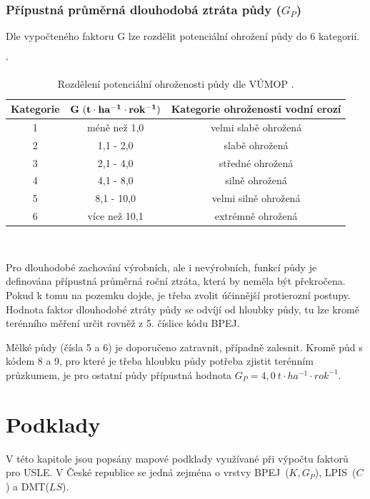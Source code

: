 \subsection{Přípustná průměrná dlouhodobá ztráta půdy ($G_P$)}
Dle vypočteného faktoru G lze rozdělit potenciální ohrožení půdy do 6
kategorií.\cite{vumop}

\begin{table}[!h]
\begin{center}
\catcode`
    \noindent\begin{tabular}{|*{3}{c|}} \hline \bf Kategorie & \bf
    $\bf G~(t\cdot ha^{-1}\cdot rok^{-1})$ & \bf Kategorie ohroženosti
    vodní erozí\\ \hline 1 & méně než 1,0 & velmi slabě
    ohrožená\\ \hline 2 & 1,1 - 2,0 & slabě ohrožená\\ \hline 3 & 2,1
    - 4,0 & středné ohrožená\\ \hline 4 & 4,1 - 8,0 & silně
    ohrožená\\ \hline 5 & 8,1 - 10,0 & velmi silně ohrožená\\ \hline 6
    & více než 10,1 & extrémně ohrožená\\ \hline
    \end{tabular}\\
  \caption[Rozdělení potenciální ohroženosti půdy]{Rozdělení
    potenciální ohroženosti půdy dle VÚMOP \cite{vumop}.}
  \label{tabulka_ohrozenost}
\end{center}
\end{table}
\FloatBarrier Pro dlouhodobé zachování výrobních, ale i nevýrobních,
funkcí půdy je definována přípustná průměrná roční ztráta, která by
neměla být překročena. Pokud k tomu na pozemku dojde, je třeba zvolit
účinnější protierozní postupy. Hodnota faktor dlouhodobé ztráty půdy
se odvíjí od hloubky půdy, tu lze kromě terénního měření určit rovněž
z 5. číslice kódu BPEJ.\cite{janecek2012}

Mělké půdy (čísla 5 a 6) je doporučeno zatravnit, případně
zalesnit. Kromě půd s kódem 8 a 9, pro které je třeba hloubku půdy
potřeba zjistit terénním průzkumem, je pro ostatní půdy přípustná
hodnota $G_P=4,0~t\cdot ha^{-1}\cdot rok^{-1}$.\cite{Novotny2014}
\newpage
\chapter{Podklady}
V této kapitole jsou popsány mapové podklady využívané při výpočtu 
faktorů pro USLE. V České republice se jedná zejména o vrstvy 
BPEJ~($K, G_P$), LPIS~($C$) a DMT($LS$).
